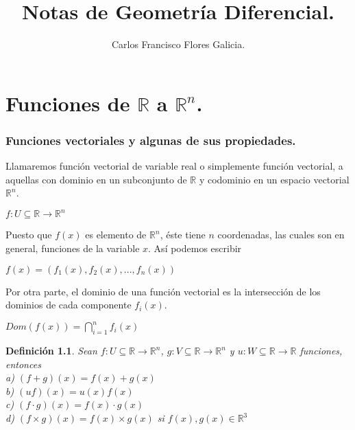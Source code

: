 \documentclass{book}
\title{Notas de Geometría Diferencial.}
\author{Carlos Francisco Flores Galicia.}
\date{}
\newtheorem{definition}{Definición}[section]
\begin{document}
 
\maketitle

\chapter{Funciones de $\mathbb{R}$ a $\mathbb{R}^n$.}
\subsection{Funciones vectoriales y algunas de sus propiedades.}


Llamaremos función vectorial de variable real o simplemente función vectorial, a aquellas con dominio en
un subconjunto de $\mathbb{R}$ y codominio en un espacio vectorial $\mathbb{R}^n$.

\begin{center}
    $f:U \subseteq \mathbb{R} \rightarrow \mathbb{R}^n$
\end{center}

Puesto que $f(x)$ es elemento de $\mathbb{R}^n$, éste tiene $n$ coordenadas, las cuales son en general, funciones de la variable $x$. Así podemos escribir

\begin{center}
    $f(x)=(f_1(x),f_2(x),...,f_n(x))$
\end{center}

Por otra parte, el dominio de una función vectorial es la intersección de los dominios de cada componente $f_i(x)$.

\begin{center}
    $\displaystyle Dom(f(x))= \bigcap^n_{i=1}f_i(x)$
\end{center}

\begin{definition}
Sean $f:U \subseteq \mathbb{R} \rightarrow \mathbb{R}^n$,  $g:V \subseteq \mathbb{R} \rightarrow \mathbb{R}^n$ y $u:W \subseteq \mathbb{R} \rightarrow \mathbb{R}$ funciones, entonces \\[1\baselineskip]
a) $(f+g)(x)=f(x)+g(x)$\\[0\baselineskip]
b) $(uf)(x)=u(x)f(x)$\\[0\baselineskip]
c) $(f \cdot g)(x)=f(x) \cdot g(x)$\\[0\baselineskip]
d) $(f \times g)(x)=f(x) \times g(x)$ si $f(x),g(x) \in \mathbb{R}^3$\\[0\baselineskip]
\end{definition}
\end{document}
